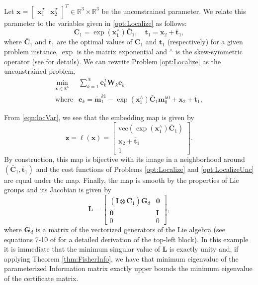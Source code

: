 \documentclass[lettersize,journal]{IEEEtran}
\newcommand{\vect}[1]{\mbox{vec}(#1)}
\begin{document}
{Let $\bm{x}= \begin{bmatrix} \bm{x}_1^T & \bm{x}_2^T\end{bmatrix}^T \in \mathbb{R}^3\times\mathbb{R}^3$ be the unconstrained parameter. We relate this parameter to the variables given in \ref{opt:Localize} as follows:
\begin{equation}
	\bm{C}_1 = \exp(\bm{x}_1^\wedge)\bar{\bm{C}}_1, \quad \bm{t}_1 = \bm{x}_2 + \bar{\bm{t}}_1,
\end{equation} 
where $\bar{\bm{C}}_1$ and $\bar{\bm{t}}_1$ are the optimal values of $\bm{C}_1$ and $\bm{t}_1$ (respectively) for a given problem instance, $\exp$ is the matrix exponential and $^\wedge$ is the skew-symmetric operator (see \cite{barfoot2011state} for details). We can rewrite Problem \ref{opt:Localize} as the unconstrained problem,
\begin{equation}
	\label{opt:LocalizeUnc}
	\begin{array}{rl}
		\min\limits_{\bm{x} \in \mathbb{R}^6} &\sum\limits_{k=1}^N \bm{e}_{k}^T \bm{W}_{k} \bm{e}_{k} \\
		\mbox{where} & \bm{e}_{k} = \tilde{\bm{m}}_1^{k1} - \exp(\bm{x}_1^\wedge)\bar{\bm{C}}_1\bm{m}_0^{k0} + \bm{x}_2 + \bar{\bm{t}}_1,
	\end{array}
\end{equation}

From \eqref{eqn:locVar}, we see that the embedding map is given by
\begin{equation}
	\bm{z}=\bm{\ell}(\bm{x}) = \begin{bmatrix}
		\vect{\exp(\bm{x}_1^\wedge)\bar{\bm{C}}_1}\\ \bm{x}_2 + \bar{\bm{t}}_1 \\ 1
	\end{bmatrix}.
\end{equation}
By construction, this map is bijective with its image in a neighborhood around $(\bar{\bm{C}}_1, \bar{\bm{t}}_1)$ and the cost functions of Problems \ref{opt:Localize} and \ref{opt:LocalizeUnc} are equal under the map. Finally, the map is smooth by the properties of Lie groups and its Jacobian is given by
\begin{equation}
	\bm{L} = \begin{bmatrix}
		(\bm{I}\otimes\bar{\bm{C}}_1) \bar{\bm{G}}_d & \bm{0}\\
		\bm{0} & \bm{I}\\
		0 & 0
	\end{bmatrix},
\end{equation}
where $\bar{\bm{G}}_d$ is a matrix of the vectorized generators of the Lie algebra (see equations 7-10 of \cite{dellaertShonanRotationAveraging2020} for a detailed derivation of the top-left block). In this example it is immediate that the minimum singular value of $\bm{L}$ is exactly unity and, if applying Theorem \ref{thm:FisherInfo}, we have that minimum eigenvalue of the parameterized Information matrix exactly upper bounds the minimum eigenvalue of the certificate matrix.

}
\end{document}
